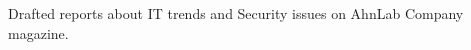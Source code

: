 
      \begin{cvitems}
        \item {Drafted reports about IT trends and Security issues on AhnLab Company magazine.}
      \end{cvitems}

